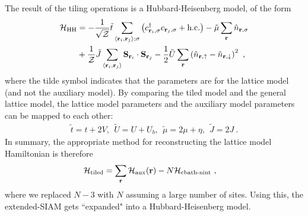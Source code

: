 \documentclass[reprint,hidelinks,onecolumn]{revtex4-2}
\begin{document}
The result of the tiling operations is a Hubbard-Heisenberg model, of the form
\begin{equation}\begin{aligned}
	\mathcal{H}_\text{HH} &= -\frac{1}{\sqrt\mathcal{Z}}\tilde t\sum_{\left<{\bf r}_i, {\bf r}_j\right>;\sigma}\left(c^\dagger_{{\bf r}_i,\sigma}c_{{\bf r}_j,\sigma} + \text{h.c.}\right) - \tilde \mu \sum_{{\bf r}}\hat n_{{\bf r},\sigma}\\
						  &+ \frac{1}{\mathcal{Z}}\tilde J\sum_{\left< {\bf r}_i, {\bf r}_j\right>}{\bf S}_{{\bf r}_i}\cdot{\bf S}_{{\bf r}_j} - \frac{1}{2}\tilde U\sum_{\bf r}\left(\hat n_{{\bf r} , \uparrow} - \hat n_{{\bf r} , \downarrow}\right)^2  ~,
\end{aligned}\end{equation}
where the tilde symbol indicates that the parameters are for the lattice model (and not the auxiliary model). By comparing the tiled model and the general lattice model, the lattice model parameters and the auxiliary model parameters can be mapped to each other:
\begin{equation}\begin{aligned}\label{couplingsMappings}
	\tilde t = t+2V,~~ \tilde U = U + U_b, ~ ~ \tilde \mu = 2\mu + \eta,~ ~ \tilde J = 2J~.
\end{aligned}\end{equation}
In summary, the appropriate method for reconstructing the lattice model Hamiltonian is therefore
\begin{equation}\begin{aligned}\label{tilingPrescriptionFinal}
	\mathcal{H}_\text{tiled} &= \sum_{{\bf r}}\mathcal{H}_\text{aux}({\bf r}) - N\mathcal{H}_\text{cbath-nint}~,
\end{aligned}\end{equation}
where we replaced \(N-3\) with \(N\) assuming a large number of sites. Using this, the extended-SIAM gets ``expanded" into a Hubbard-Heisenberg model.
\end{document}
